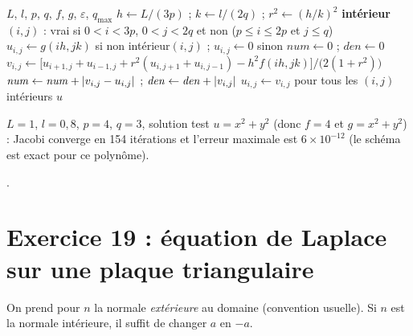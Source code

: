 \begin{algo}
  \Require $L$, $l$, $p$, $q$, $f$, $g$, $\varepsilon$, $q_{\max}$
  \State $h \leftarrow L/(3p)$ ; $k \leftarrow l/(2q)$ ; $r^2 \leftarrow (h/k)^2$
  \State \textbf{intérieur}$(i,j)$ : vrai si $0 < i < 3p$, $0 < j < 2q$ et non ($p \le i \le 2p$ et $j \le q$)
  \State $u_{i,j} \leftarrow g(ih, jk)$ si non intérieur$(i,j)$ ; $u_{i,j} \leftarrow 0$ sinon
    \State $\mathit{num} \leftarrow 0$ ; $\mathit{den} \leftarrow 0$
      \State $v_{i,j} \leftarrow \bigl[u_{i+1,j} + u_{i-1,j} + r^2(u_{i,j+1} + u_{i,j-1}) - h^2f(ih, jk)\bigr]/\bigl(2(1+r^2)\bigr)$
      \State $\mathit{num} \leftarrow \mathit{num} + \left|v_{i,j} - u_{i,j}\right|$ ; $\mathit{den} \leftarrow \mathit{den} + \left|v_{i,j}\right|$
    \EndFor
    \State $u_{i,j} \leftarrow v_{i,j}$ pour tous les $(i,j)$ intérieurs
     \Print $u$ \Stop \EndIf
  \EndFor
\end{algo}

\Verif $L = 1$, $l = 0{,}8$, $p = 4$, $q = 3$, solution test $u = x^2 + y^2$
(donc $f = 4$ et $g = x^2 + y^2$) : Jacobi converge en 154 itérations et
l'erreur maximale est $6\times 10^{-12}$ (le schéma est exact pour ce polynôme).

\Refs {}.

\section{Exercice 19 : équation de Laplace sur une plaque triangulaire}

\Attention On prend pour $n$ la normale \emph{extérieure} au domaine (convention
usuelle). Si $n$ est la normale intérieure, il suffit de changer $a$ en $-a$.

